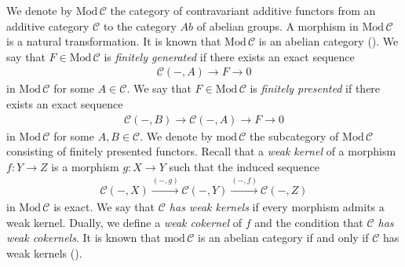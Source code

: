 \documentclass[12pt]{amsart}
\numberwithin{equation}{subsection}
\theoremstyle{plain}
\theoremstyle{definition}
\renewcommand{\mod}{\mathrm{mod}\,}
\newcommand{\Mod}{\mathrm{Mod}\,}
\newcommand{\C}{\mathcal{C}}
\begin{document}
We denote by $\Mod\C$ the category of contravariant additive functors from an additive category $\C$ to the category $Ab$ of abelian groups.
A morphism in $\Mod\C$ is a natural transformation.
It is known that $\Mod\C$ is an abelian category (\cite[Chapter 5]{Freyd_book}).
We say that $F\in\Mod\C$ is {\it finitely generated} if there exists an exact sequence
\begin{align}
  \C(-,A) \to F \to 0
\end{align}
in $\Mod\C$ for some $A\in \C$.
We say that $F\in\Mod\C$ is {\it finitely presented} if there exists an exact sequence
\begin{align}
    \C(-,B) \to \C(-,A) \to F \to 0
\end{align}
in $\Mod\C$ for some $A, B\in \C$.
We denote by $\mod\C$ the subcategory of $\Mod\C$ consisting of finitely presented functors.
Recall that a {\it weak kernel} of a morphism $f: Y \to Z$ is a morphism $g: X \to Y$ such that the induced sequence
\begin{align}
    \C(-,X) \xrightarrow{(-,g)} \C(-,Y) \xrightarrow{(-,f)} \C(-,Z) 
\end{align}
in $\Mod\C$ is exact.
We say that {\it $\C$ has weak kernels} if every morphism admits a weak kernel. 
Dually, we define a {\it weak cokernel} of $f$ and the condition that {\it $\C$ has weak cokernels}.
It is known that $\mod\C$ is an abelian category if and only if $\C$ has weak kernels (\cite[Theorem 1.4]{Freyd_1966}).
\end{document}
